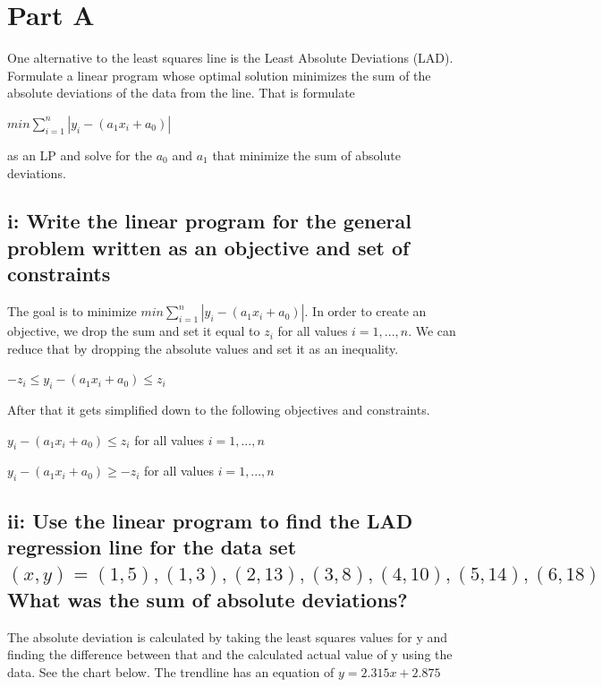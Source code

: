 
\section{Part A}
One alternative to the least squares line is the Least Absolute Deviations (LAD). Formulate a linear program whose optimal solution minimizes the sum of the absolute deviations of the data from the line. That is formulate 
\begin{center} $ min  \sum_{i=1}^{n} |y_{i} - (a_{1}x_{i} + a_{0})|$ \end{center} 
as an LP and solve for the $a_0$ and $a_1$ that minimize the sum of absolute deviations.

\subsection{i: Write the linear program for the general problem written as an objective and set of constraints}
The goal is to minimize $ min  \sum_{i=1}^{n} |y_{i} - (a_{1}x_{i} + a_{0})|$. In order to create an objective, we drop the sum and set it equal to $z_i$ for all values $i = 1,...,n$. We can reduce that by dropping the absolute values and set it as an inequality.
\begin{center} $-z_{i} \leq y_{i} - (a_{1}x_{i} + a_{0}) \leq z_{i}$  \end{center}
After that it gets simplified down to the following objectives and constraints. 

\begin{center} $ y_{i} - (a_{1}x_{i} + a_{0}) \leq z_{i}$  for all values $i = 1,...,n$\end{center}
\begin{center} $ y_{i} - (a_{1}x_{i} + a_{0}) \geq -z_{i}$  for all values $i = 1,...,n$\end{center}

\subsection{ii: Use the linear program to find the LAD regression line for the data set $(x,y) = { (1,5), (1, 3), (2, 13), ( 3, 8), (4,10), ( 5, 14), (6, 18) }$
What was the sum of absolute deviations?}

The absolute deviation is calculated by taking the least squares values for y and finding the difference between that and the calculated actual value of y using the data. See the chart below. The trendline has an equation of $y = 2.315x + 2.875$

